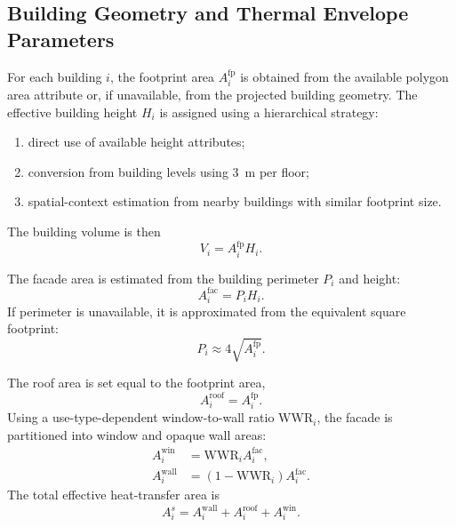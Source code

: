 \documentclass[conference]{IEEEtran}
\begin{document}
\subsection{Building Geometry and Thermal Envelope Parameters}
For each building $i$, the footprint area $A^{\mathrm{fp}}_i$ is obtained from the available polygon area attribute or, if unavailable, from the projected building geometry. The effective building height $H_i$ is assigned using a hierarchical strategy:
\begin{enumerate}
    \item direct use of available height attributes;
    \item conversion from building levels using \SI{3}{m} per floor;
    \item spatial-context estimation from nearby buildings with similar footprint size.
\end{enumerate}
The building volume is then
\begin{equation}
    V_i = A^{\mathrm{fp}}_i H_i.
\end{equation}

The facade area is estimated from the building perimeter $P_i$ and height:
\begin{equation}
    A^{\mathrm{fac}}_i = P_i H_i.
\end{equation}
If perimeter is unavailable, it is approximated from the equivalent square footprint:
\begin{equation}
    P_i \approx 4\sqrt{A^{\mathrm{fp}}_i}.
\end{equation}

The roof area is set equal to the footprint area,
\begin{equation}
    A^{\mathrm{roof}}_i = A^{\mathrm{fp}}_i.
\end{equation}
Using a use-type-dependent window-to-wall ratio $\mathrm{WWR}_i$, the facade is partitioned into window and opaque wall areas:
\begin{align}
    A^{\mathrm{win}}_i &= \mathrm{WWR}_i A^{\mathrm{fac}}_i, \\
    A^{\mathrm{wall}}_i &= (1-\mathrm{WWR}_i) A^{\mathrm{fac}}_i.
\end{align}
The total effective heat-transfer area is
\begin{equation}
    A^{s}_i = A^{\mathrm{wall}}_i + A^{\mathrm{roof}}_i + A^{\mathrm{win}}_i.
\end{equation}
\end{document}

